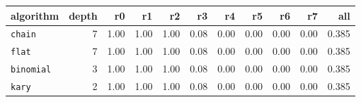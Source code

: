 \begin{tabular}{lrrrrrrrrrr}
\toprule
algorithm & depth & r0 & r1 & r2 & r3 & r4 & r5 & r6 & r7 & all \\
\midrule
\texttt{chain} & 7 & 1.00 & 1.00 & 1.00 & 0.08 & 0.00 & 0.00 & 0.00 & 0.00 & 0.385 \\
\texttt{flat} & 7 & 1.00 & 1.00 & 1.00 & 0.08 & 0.00 & 0.00 & 0.00 & 0.00 & 0.385 \\
\texttt{binomial} & 3 & 1.00 & 1.00 & 1.00 & 0.08 & 0.00 & 0.00 & 0.00 & 0.00 & 0.385 \\
\texttt{kary} & 2 & 1.00 & 1.00 & 1.00 & 0.08 & 0.00 & 0.00 & 0.00 & 0.00 & 0.385 \\
\bottomrule
\end{tabular}
